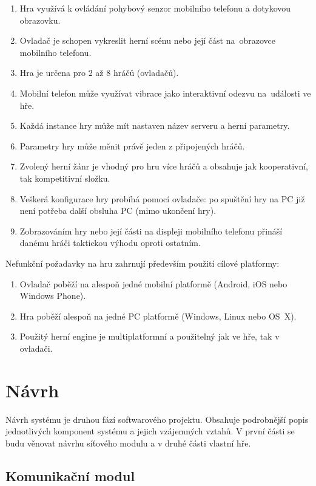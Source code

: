 \documentclass[thesis=B,czech,hidelinks]{FITthesis}[2012/06/26] %
\begin{document}
\begin{enumerate}
	\item Hra využívá k ovládání pohybový senzor mobilního telefonu a dotykovou obrazovku.
	\item Ovladač je schopen vykreslit herní scénu nebo její část na~obrazovce mobilního telefonu.
	\item Hra je určena pro 2 až 8 hráčů (ovladačů).
	\item Mobilní telefon může využívat vibrace jako interaktivní odezvu na~události ve hře.
 	\item Každá instance hry může mít nastaven název serveru a herní parametry.
	\item Parametry hry může měnit právě jeden z připojených hráčů.
	\item Zvolený herní žánr je vhodný pro hru více hráčů a obsahuje jak kooperativní, tak kompetitivní složku.
	\item Veškerá konfigurace hry probíhá pomocí ovladače: po spuštění hry na PC již není potřeba další obsluha PC (mimo ukončení hry).
	\item Zobrazováním hry nebo její části na displeji mobilního telefonu přináší danému hráči taktickou výhodu oproti ostatním.

\end{enumerate}

Nefunkční požadavky na hru zahrnují především použití cílové platformy:

\begin{enumerate}
	\item Ovladač poběží na alespoň jedné mobilní platformě (Android, iOS nebo Windows Phone).
	\item Hra poběží alespoň na jedné PC platformě (Windows, Linux nebo OS~X).
	\item Použitý herní engine je multiplatformní a použitelný jak ve hře, tak v ovladači.
\end{enumerate}

\section{Návrh}

Návrh systému je druhou fází softwarového projektu. Obsahuje podrobnější popis jednotlivých komponent systému a jejich vzájemných vztahů. V první části se budu věnovat návrhu síťového modulu a v druhé části vlastní hře.

\subsection{Komunikační modul}
\end{document}
